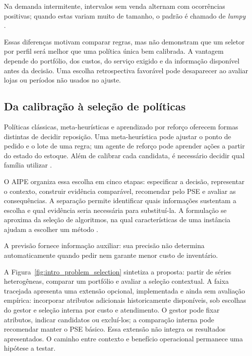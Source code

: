Na demanda intermitente, intervalos sem venda alternam com ocorrências positivas; quando estas variam muito de tamanho, o padrão é chamado de \textit{lumpy} \citep{Croston1972ForecastingIntermittentDemand,Syntetos2005Categorization,Boylan2008Intermittent}.

Essas diferenças motivam comparar regras, mas não demonstram que um seletor por perfil será melhor que uma política única bem calibrada. A vantagem depende do portfólio, dos custos, do serviço exigido e da informação disponível antes da decisão. Uma escolha retrospectiva favorável pode desaparecer ao avaliar lojas ou períodos não usados no ajuste.

\subsection{Da calibração à seleção de políticas}

Políticas clássicas, meta-heurísticas e aprendizado por reforço oferecem formas distintas de decidir reposição. Uma meta-heurística pode ajustar o ponto de pedido e o lote de uma regra; um agente de reforço pode aprender ações a partir do estado do estoque. Além de calibrar cada candidata, é necessário decidir qual família utilizar \citep{Syntetos2009InventoryForecastingReview,Boute2022DRLInventoryRoadmap}.

O AIPE organiza essa escolha em cinco etapas: especificar a decisão, representar o contexto, construir evidência comparável, recomendar pelo PSE e avaliar as consequências. A separação permite identificar quais informações sustentam a escolha e qual evidência seria necessária para substituí-la. A formulação se aproxima da seleção de algoritmos, na qual características de uma instância ajudam a escolher um método \citep{Rice1976AlgorithmSelection,Kotthoff2014AlgorithmSelection}.

A previsão fornece informação auxiliar: sua precisão não determina automaticamente quando pedir nem garante menor custo de inventário.

A Figura~\ref{fig:intro_problem_selection} sintetiza a proposta: partir de séries heterogêneas, comparar um portfólio e avaliar a seleção contextual. A faixa tracejada apresenta uma extensão opcional, implementada e ainda sem avaliação empírica: incorporar atributos adicionais historicamente disponíveis, sob escolhas do gestor e seleção interna por custo e atendimento. O gestor pode fixar atributos, indicar candidatos ou excluí-los; a comparação interna pode recomendar manter o PSE básico. Essa extensão não integra os resultados apresentados. O caminho entre contexto e benefício operacional permanece uma hipótese a testar.

